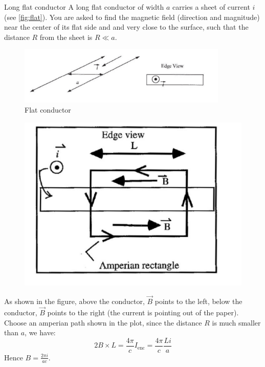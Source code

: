 \documentclass[makesolutionspdf]{esg8022pset}
\begin{document}
\begin{problem}{Long flat conductor}
  A long flat conductor of width $a$ carries a sheet of current $i$ (see
  \autoref{fig:flat}). You are asked to find the magnetic field (direction and
  magnitude) near the center of its flat side and and very close to the
  surface, such that the distance $R$ from the sheet is $R \ll a$.

  \begin{figure}[H]
    \centering
    \includegraphics[width = 10cm]{flat_conductor}
    \caption{Flat conductor}
    \label{fig:flat}
  \end{figure}
\end{problem}

\begin{solution}
  \begin{figure}[H]
    \centering
    \includegraphics[width = 12cm]{flat_conductor_sol}
  \end{figure}

  As shown in the figure, above the conductor, $\vec{B}$ points to the left,
  below the conductor, $\vec{B}$  points to the right (the current is pointing
  out of the paper).  Choose an amperian path shown in the plot, since the
  distance $R$ is much smaller than $a$, we have:
  \begin{equation}
    2B \times L = \frac{4 \pi}{c} I_{\text{enc}} = \frac{4 \pi}{c} \frac{L i}{a}
  \end{equation}
  Hence $B=\frac{2 \pi i}{a c}$.
\end{solution}
\end{document}
